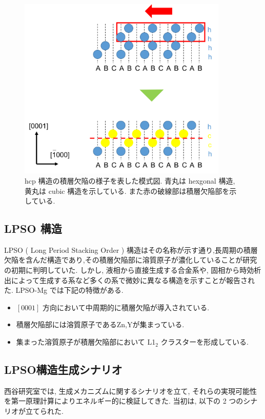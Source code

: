 \begin{figure}[htbp]
	\begin{center}
		\includegraphics[width=100mm]{../intro/stuc.png}
		\caption{hcp 構造の積層欠陥の様子を表した模式図. 青丸は hexgonal 構造, 黄丸は cubic 構造を示している. また赤の破線部は積層欠陥部を示している.}
		\label{fig1}
	\end{center}
\end{figure}

\subsection{LPSO 構造}
LPSO ( Long Period Stacking Order ) 構造はその名称が示す通り,長周期の積層欠陥を含んだ構造であり,その積層欠陥部に溶質原子が濃化していることが研究の初期に判明していた. しかし, 液相から直接生成する合金系や, 固相から時効析出によって生成する系など多くの系で微妙に異なる構造を示すことが報告された. LPSO-Mg では下記の特徴がある.

\begin{itemize}
  \item $[0001]$ 方向において中周期的に積層欠陥が導入されている.
  \item 積層欠陥部には溶質原子であるZn,Yが集まっている.
  \item 集まった溶質原子が積層欠陥部において L1$_2$ クラスターを形成している.
\end{itemize}


\subsection{LPSO構造生成シナリオ}
西谷研究室では, 生成メカニズムに関するシナリオを立て, それらの実現可能性を第一原理計算によりエネルギー的に検証してきた. 当初は, 以下の 2 つのシナリオが立てられた.

